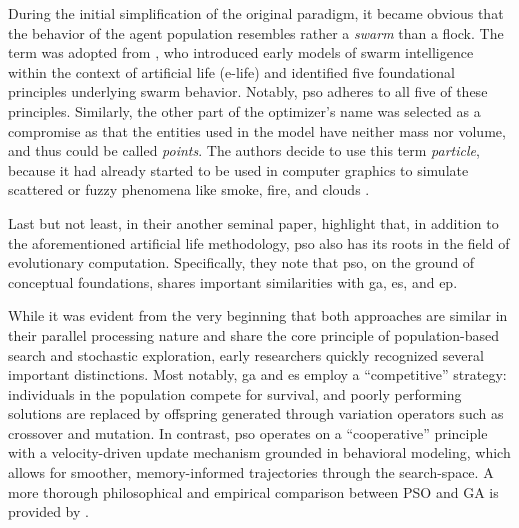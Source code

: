 {During the initial simplification of the original paradigm, it became obvious that the behavior of the agent population resembles rather a \textit{swarm} than a flock. The term was adopted from \citet{millonas1993swarms}, who introduced early models of swarm intelligence within the context of artificial life (e-life) and identified five foundational principles underlying swarm behavior. Notably, \acrshort{pso} adheres to all five of these principles.
Similarly, the other part of the optimizer's name was selected as a compromise as that the entities used in the model have neither mass nor volume, and thus could be called \textit{points}. The authors decide to use this term \textit{particle}, because it had already started to be used in computer graphics to simulate scattered or fuzzy phenomena like smoke, fire, and clouds \citep{reeves1983particle}.


Last but not least, in their another seminal paper, \citet{eberhart1995new} highlight that, in addition to the aforementioned artificial life methodology, \acrlong{pso} also has its roots in the field of evolutionary computation. Specifically, they note that \acrshort{pso}, on the ground of conceptual foundations, shares important similarities with \acrfull{ga}, \acrfull{es}, and \acrfull{ep}.

While it was evident from the very beginning that both approaches are similar in their parallel processing nature and share the core principle of population-based search and stochastic exploration, early researchers quickly recognized several important distinctions. Most notably,  \acrshort{ga} and \acrshort{es} employ a ``competitive'' strategy: individuals in the population compete for survival, and poorly performing solutions are replaced by offspring generated through variation operators such as crossover and mutation. In contrast, \acrshort{pso} operates on a ``cooperative'' principle with a velocity-driven update mechanism grounded in behavioral modeling, which allows for smoother, memory-informed trajectories through the \gls{search-space}. A more thorough philosophical and empirical comparison between PSO and GA is provided by \citet{angeline1998evolutionary}.





}
